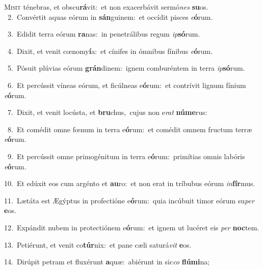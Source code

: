 \lettrine{\initial\textcolor{\initialcolor}{M}}{isit} ténebras, et obscu\-\textbf{rá}\-vit:~\star et non exacerbávit sermó\textit{nes} \textbf{su}\-os.\\
{\numbfont\textcolor{\numbcolor}{~2.}}~Convértit aquas eórum in \textbf{sán}\-guinem:~\star et occídit pisces \textit{e}\-\textbf{ó}rum.\par
{\numbfont\textcolor{\numbcolor}{~3.}}~Edidit terra eórum \textbf{ra}\-nas:~\star in penetrálibus regum \textit{ip}\-\textbf{só}rum.\par
{\numbfont\textcolor{\numbcolor}{~4.}}~Dixit, et venit cœnomy\-\textbf{í}\-a:~\star et cínifes in ómnibus fínibus \textit{e}\-\textbf{ó}rum.\par
{\numbfont\textcolor{\numbcolor}{~5.}}~Pósuit plúvias eórum \textbf{grán}\-dinem:~\star ignem comburéntem in terra \textit{ip}\-\textbf{só}rum.\par
{\numbfont\textcolor{\numbcolor}{~6.}}~Et percússit víneas eórum, et ficúlneas e\-\textbf{ó}\-rum:~\star et contrívit lignum fínium \textit{e}\-\textbf{ó}rum.\par
{\numbfont\textcolor{\numbcolor}{~7.}}~Dixit, et venit locústa, et \textbf{bru}\-chus,~\star cujus non e\textit{rat} \textbf{nú}\-\textbf{me}rus:\par
{\numbfont\textcolor{\numbcolor}{~8.}}~Et comédit omne fœnum in terra e\-\textbf{ó}\-rum:~\star et comédit omnem fructum terræ \textit{e}\-\textbf{ó}rum.\par
{\numbfont\textcolor{\numbcolor}{~9.}}~Et percússit omne primogénitum in terra e\-\textbf{ó}\-rum:~\star primítias omnis labóris \textit{e}\-\textbf{ó}rum.\par
{\numbfont\textcolor{\numbcolor}{10.}}~Et edúxit eos cum argénto et \textbf{au}\-ro:~\star et non erat in tríbubus eórum \textit{in}\-\textbf{fír}mus.\par
{\numbfont\textcolor{\numbcolor}{11.}}~Lætáta est Ægýptus in profectióne e\-\textbf{ó}\-rum:~\star quia incúbuit timor eórum su\textit{per} \textbf{e}\-os.\par
{\numbfont\textcolor{\numbcolor}{12.}}~Expándit nubem in protectiónem e\-\textbf{ó}\-rum:~\star et ignem ut lucéret eis \textit{per} \textbf{noc}\-tem.\par
{\numbfont\textcolor{\numbcolor}{13.}}~Petiérunt, et venit co\-\textbf{túr}\-nix:~\star et pane cæli saturá\textit{vit} \textbf{e}\-os.\par
{\numbfont\textcolor{\numbcolor}{14.}}~Dirúpit petram et fluxérunt \textbf{a}\-quæ:~\star abiérunt in sic\textit{co} \textbf{flú}\-\textbf{mi}na;\par
